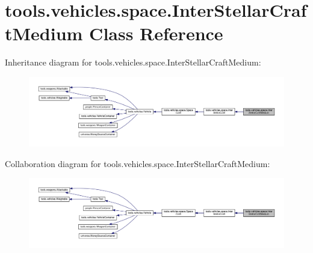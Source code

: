 \hypertarget{classtools_1_1vehicles_1_1space_1_1_inter_stellar_craft_medium}{}\section{tools.\+vehicles.\+space.\+Inter\+Stellar\+Craft\+Medium Class Reference}
\label{classtools_1_1vehicles_1_1space_1_1_inter_stellar_craft_medium}


Inheritance diagram for tools.\+vehicles.\+space.\+Inter\+Stellar\+Craft\+Medium\+:
\nopagebreak
\begin{figure}[H]
\begin{center}
\leavevmode
\includegraphics[width=350pt]{classtools_1_1vehicles_1_1space_1_1_inter_stellar_craft_medium__inherit__graph}
\end{center}
\end{figure}


Collaboration diagram for tools.\+vehicles.\+space.\+Inter\+Stellar\+Craft\+Medium\+:
\nopagebreak
\begin{figure}[H]
\begin{center}
\leavevmode
\includegraphics[width=350pt]{classtools_1_1vehicles_1_1space_1_1_inter_stellar_craft_medium__coll__graph}
\end{center}
\end{figure}
